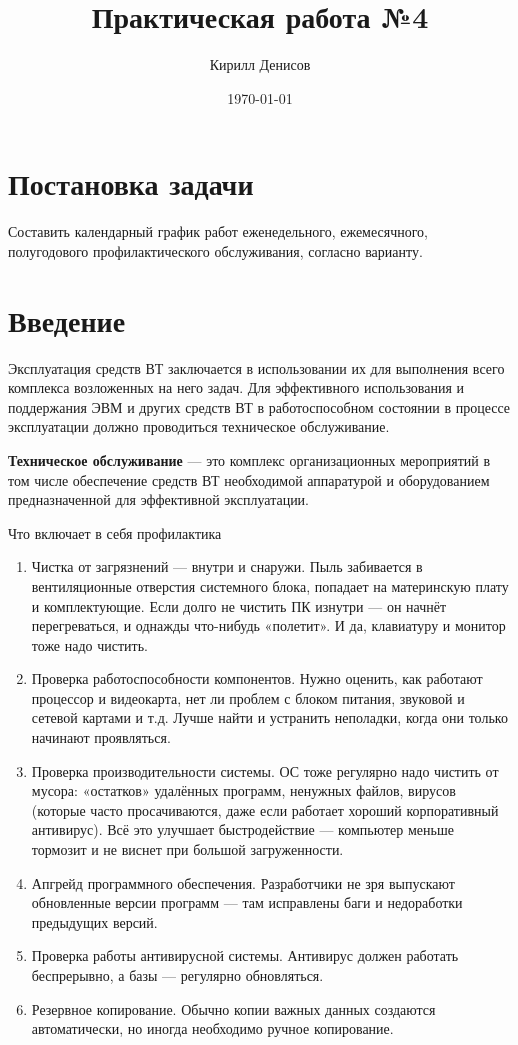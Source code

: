 \documentclass[a4paper,14pt]{extarticle}
\author{Кирилл Денисов}
\title{Практическая работа №4}
\date{\today}
\newcommand{\pathToCommonFolder}{/home/denilai/Documents/repos/latex/Common}
\begin{document}
	\thispagestyle{empty}
	
	\newpage
	\tableofcontents
	\newpage
	
	
	
	
\section{Постановка задачи}

Составить календарный график работ еженедельного, ежемесячного, полугодового профилактического обслуживания, согласно варианту.

\section{Введение} 

Эксплуатация средств ВТ заключается в использовании их для выполнения всего комплекса возложенных на него задач. Для эффективного использования и поддержания ЭВМ и других средств ВТ в работоспособном состоянии в процессе эксплуатации должно проводиться техническое обслуживание.

\textbf{Техническое обслуживание} --- это комплекс организационных мероприятий в том числе обеспечение средств ВТ необходимой аппаратурой и оборудованием предназначенной для эффективной эксплуатации.

Что включает в себя профилактика
\begin{enumerate}
\item Чистка от загрязнений --- внутри и снаружи. Пыль забивается в вентиляционные отверстия системного блока, попадает на материнскую плату и комплектующие. Если долго не чистить ПК изнутри --- он начнёт перегреваться, и однажды что-нибудь «полетит». И да, клавиатуру и монитор тоже надо чистить.

\item  Проверка работоспособности компонентов. Нужно оценить, как работают процессор и видеокарта, нет ли проблем с блоком питания, звуковой и сетевой картами и т.д. Лучше найти и устранить неполадки, когда они только начинают проявляться.

\item  Проверка производительности системы. ОС тоже регулярно надо чистить от мусора: «остатков» удалённых программ, ненужных файлов, вирусов (которые часто просачиваются, даже если работает хороший корпоративный антивирус). Всё это улучшает быстродействие --- компьютер меньше тормозит и не виснет при большой загруженности.

\item  Апгрейд программного обеспечения. Разработчики не зря выпускают обновленные версии программ --- там исправлены баги и недоработки предыдущих версий.

\item  Проверка работы антивирусной системы. Антивирус должен работать беспрерывно, а базы --- регулярно обновляться.

\item  Резервное копирование. Обычно копии важных данных создаются автоматически, но иногда необходимо ручное копирование.
\end{enumerate}
\end{document}

